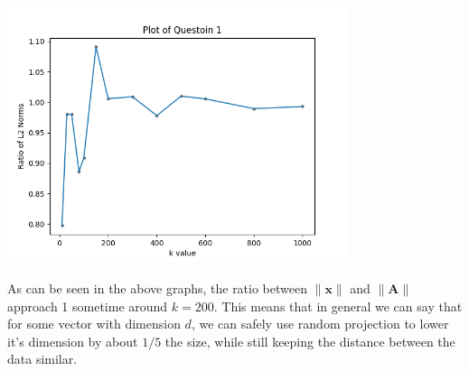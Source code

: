 \documentclass[12pt]{article}
\begin{document}
\begin{center}
    \includegraphics[width=10cm]{Figure_3.png}
    \end{center}

    As can be seen in the above graphs, the ratio between \(\|\textbf{x}\|\) and 
    \(\|\textbf{A}\|\) approach 1 sometime around \(k=200\). 
    This means that in general we can say that for some vector with 
    dimension \(d\), we can safely use random projection to lower it's dimension 
    by about \(1/5\) the size, while
    still keeping the distance between the data similar.
\end{document}
